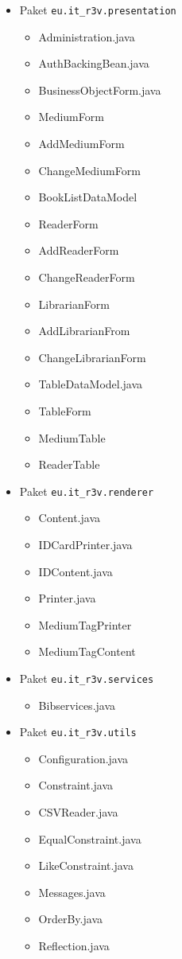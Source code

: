 \documentclass[fontsize=12pt,paper=a4,twoside]{scrartcl}
\begin{document}
\begin{itemize}
\item{Paket \texttt{eu.it\_r3v.presentation}}
\begin{itemize}
\item{Administration.java}
\item{AuthBackingBean.java}
\item{BusinessObjectForm.java}
\item{MediumForm}
\item{AddMediumForm}
\item{ChangeMediumForm}
\item{BookListDataModel}
\item{ReaderForm}
\item{AddReaderForm}
\item{ChangeReaderForm}
\item{LibrarianForm}
\item{AddLibrarianFrom}
\item{ChangeLibrarianForm}
\item{TableDataModel.java}
\item{TableForm}
\item{MediumTable}
\item{ReaderTable}
\end{itemize}

\item{Paket \texttt{eu.it\_r3v.renderer}}

\begin{itemize}
\item{Content.java}
\item{IDCardPrinter.java}
\item{IDContent.java}
\item{Printer.java}
\item{MediumTagPrinter}
\item{MediumTagContent}
\end{itemize}

\item{Paket \texttt{eu.it\_r3v.services}}

\begin{itemize}
\item{Bibservices.java}
\end{itemize}

\item{Paket \texttt{eu.it\_r3v.utils}}

\begin{itemize}
\item{Configuration.java}
\item{Constraint.java}
\item{CSVReader.java}
\item{EqualConstraint.java}
\item{LikeConstraint.java}
\item{Messages.java}
\item{OrderBy.java}
\item{Reflection.java}
\end{itemize}

\end{itemize}
\end{document}

